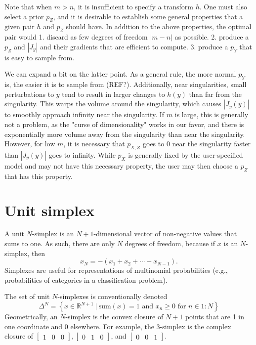 \documentclass[11pt]{article}
\newcommand{\setcomp}[2]{\left\{ #1 \ \Big|\ #2 \right\}}
\newcommand{\rngto}[1]{1{:}#1}
\begin{document}
Note that when $m > n$, it is insufficient to specify a transform $h$.
One must also select a prior $p_Z$, and it is desirable to establish some general properties that a given pair $h$ and $p_Z$ should have.
In addition to the above properties, the optimal pair would
1. discard as few degrees of freedom $|m - n|$ as possible.
2. produce a $p_Z$ and $|J_y|$ and their gradients that are efficient to compute.
3. produce a $p_Y$ that is easy to sample from.

We can expand a bit on the latter point.
As a general rule, the more normal $p_Y$ is, the easier it is to sample from (REF?).
Additionally, near singularities, small perturbations to $y$ tend to result in larger changes to $h(y)$ than far from the singularity.
This warps the volume around the singularity, which causes $|J_y(y)|$ to smoothly approach infinity near the singularity.
If $m$ is large, this is generally not a problem, as the "curse of dimensionality" works in our favor, and there is exponentially more volume away from the singularity than near the singularity.
However, for low $m$, it is necessary that $p_{X,Z}$ goes to 0 near the singularity faster than $|J_y(y)|$ goes to infinity.
While $p_X$ is generally fixed by the user-specified model and may not have this necessary property, the user may then choose a $p_Z$ that has this property.

\section{Unit simplex}

A unit $N$-simplex is an $N + 1$-dimensional vector of non-negative
values that sums to one.  As such, there are only $N$ degrees of
freedom, because if $x$ is an $N$-simplex, then
\[
  x_N = -(x_1 + x_2 + \cdots + x_{N-1}).
\]
Simplexes are useful for representations of multinomial probabilities
(e.g., probabilities of categories in a classification problem).

The set of unit $N$-simplexes is conventionally denoted
\[
  \Delta^N = \setcomp{x \in \mathbb{R}^{N + 1}}{\textrm{sum}(x) = 1
    \textrm{ and }
    x_n \geq 0 \textrm{ for } n \in \rngto{N}}
\]
Geometrically, an $N$-simplex is the convex closure of $N+1$ points
that are 1 in one coordinate and 0 elsewhere.  For example, the
3-simplex is the complex closure of
$\begin{bmatrix}1 & 0 & 0 \end{bmatrix},
\begin{bmatrix} 0 & 1 & 0 \end{bmatrix}$,
and $\begin{bmatrix} 0 & 0 & 1 \end{bmatrix}$.
\end{document}
